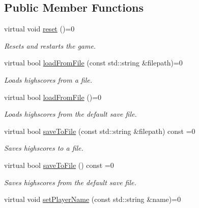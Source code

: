 \subsection*{Public Member Functions}
\begin{DoxyCompactItemize}
\item 
\mbox{\label{classArcade_1_1Games_1_1IGameModule_a8934b25efb3c948c8b3be7caa141626d}} 
virtual void \mbox{\hyperlink{classArcade_1_1Games_1_1IGameModule_a8934b25efb3c948c8b3be7caa141626d}{reset}} ()=0
\begin{DoxyCompactList}\small\item\em Resets and restarts the game. \end{DoxyCompactList}\item 
virtual bool \mbox{\hyperlink{classArcade_1_1Games_1_1IGameModule_a2a8cdd7c90677b6ebd0f97d99254d256}{load\+From\+File}} (const std\+::string \&filepath)=0
\begin{DoxyCompactList}\small\item\em Loads highscores from a file. \end{DoxyCompactList}\item 
virtual bool \mbox{\hyperlink{classArcade_1_1Games_1_1IGameModule_add4c3468c03cc41fde2baf671a4bd026}{load\+From\+File}} ()=0
\begin{DoxyCompactList}\small\item\em Loads highscores from the default save file. \end{DoxyCompactList}\item 
virtual bool \mbox{\hyperlink{classArcade_1_1Games_1_1IGameModule_a3cf053ce2f4ccfe13e9c10d8549f7c82}{save\+To\+File}} (const std\+::string \&filepath) const =0
\begin{DoxyCompactList}\small\item\em Saves highscores to a file. \end{DoxyCompactList}\item 
virtual bool \mbox{\hyperlink{classArcade_1_1Games_1_1IGameModule_ada0aa1d3d52bcdedcdb35b95d956c8ee}{save\+To\+File}} () const =0
\begin{DoxyCompactList}\small\item\em Saves highscores from the default save file. \end{DoxyCompactList}\item 
virtual void \mbox{\hyperlink{classArcade_1_1Games_1_1IGameModule_aad433296fe8a4582ebfdad5827a13d59}{set\+Player\+Name}} (const std\+::string \&name)=0

\end{DoxyCompactItemize}
